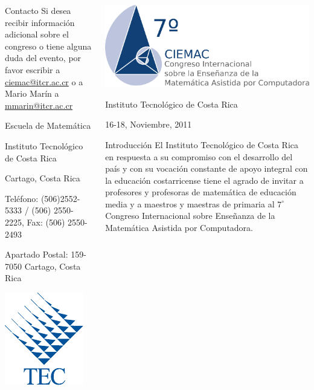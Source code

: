 \documentclass[svgnames,table, x11names, 11pt]{beamer}
\begin{document}
\begin{frame}[fragile]{}
\begin{columns}[t]
			\begin{column}{0.33\textwidth}
			\vspace{10cm}
				\begin{block}{Contacto}
Si desea recibir información adicional sobre el congreso o tiene alguna duda del evento, por favor escribir a \url{ciemac@itcr.ac.cr} o a Mario Marín a \url{mmarin@itcr.ac.cr}

Escuela de Matemática

Instituto Tecnológico de Costa Rica

Cartago, Costa Rica

Teléfono: (506)2552-5333 / (506) 2550-2225, Fax: (506) 2550-2493

Apartado Postal: 159-7050 Cartago, Costa Rica

\vspace{1cm}

\begin{center}
\includegraphics[scale=1]{LogoTEC}
\end{center}
				\end{block}
			\end{column}
			
			\begin{column}{0.33\textwidth}
			\vspace{2cm}
				\begin{center}
				\includegraphics[scale=0.5]{LogoCIEMAC}
					
				Instituto Tecnológico de Costa Rica
				
				16-18, Noviembre, 2011
				\end{center}
				\vspace{2cm}
				\begin{block}{Introducción}
El Instituto Tecnológico de Costa Rica en respuesta a su compromiso con el desarrollo del país y con su vocación constante de apoyo integral con la educación costarricense tiene el agrado de invitar a profesores y profesoras de matemática de educación media y a maestros y maestras de primaria al $7^\circ$ Congreso Internacional sobre Enseñanza de la Matemática Asistida por Computadora.


\end{block}
\end{column}
\end{columns}
\end{frame}
\end{document}
